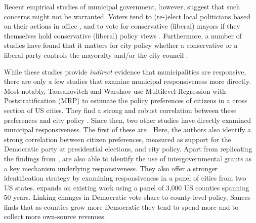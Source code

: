 \documentclass[a4paper,12pt]{article}
\begin{document}

Recent empirical studies of municipal government, however, suggest that such concerns might not be warranted. Voters tend to (re-)elect local politicians based on their actions in office \citep{arnold2012holding,burnett2017politics,boyne2009democracy}, and to vote for conservative (liberal)  mayors if they themselves hold conservative (liberal) policy views  \citep{sances2017ideology,boudreau2015lost,hopkins2017retrospective}. Furthermore, a number of studies have found that it matters for city policy whether a conservative or a liberal party controls the mayoralty and/or the city council \citep{fiva2016power,folke2014shades,blom2006parties,de2016mayoral}. 


While these studies provide \textit{indirect} evidence that municipalities are responsive, there are only a few studies that examine municipal responsiveness more directly. Most notably, Tausanovitch and Warshaw use Multilevel Regression with Poststratification (MRP) to estimate the policy preferences of citizens in a cross section of US cities. They find a strong and robust correlation between these preferences and city policy \citep[for earlier efforts, see ][]{hajnal2010or,palus2010responsiveness}. Since then, two other studies have directly examined municipal responsiveness. The first of these are \cite{einstein2016pushing}. Here, the authors also identify a strong correlation between citizen preferences, measured as support for the Democratic party at presidential elections,  and city policy. Apart from replicating the findings from \citeauthor{tausanovitch2014representation}, \citeauthor{einstein2016pushing} are also able to identify the use of intergovernmental grants as a key mechanism underlying responsiveness. They also offer a stronger identification strategy by examining responsiveness in a panel of cities from two US states.  \citet{sances2017voters} expands on existing work using a panel of 3,000 US counties spanning 50 years. Linking changes in Democratic vote share to county-level policy, Sances finds that as counties grow more Democratic they tend to spend more and to collect more own-source revenues.
\end{document}
